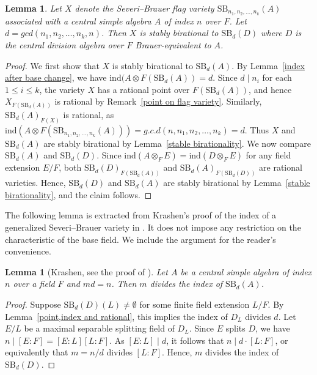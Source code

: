 \documentclass[10pt]{amsart}
\theoremstyle{plain}
\newtheorem{lemma}[thm]{Lemma}
\theoremstyle{definition}
\begin{document}
\begin{lemma}\label{Severi--Brauer flag to generalized Severi--Brauer}
     Let \(X\) denote the Severi--Brauer flag variety \(\mathrm{SB}_{n_1,n_2,\dots,n_k}(A)\) associated with a central simple algebra \(A\) of index \(n\) over \(F\). Let \( d=gcd(n_1,n_2,\dots,n_k,n)\). Then \(X\) is stably birational to \(\mathrm{SB}_d(D)\) where \(D\) is the central division algebra over \(F\) Brauer-equivalent to \(A\).
\end{lemma}
\begin{proof}
We first show that \(X\) is stably birational to \(\mathrm{SB}_d(A)\). By Lemma~\ref{index after base change}, we have \(\mathrm{ind}(A\otimes F(\mathrm{SB}_d(A))=d\). Since \(d \mid n_i\) for each \(1 \le i \le k\), the variety \(X\) has a rational point over \(F(\mathrm{SB}_d(A))\), and hence \(X_{F(\mathrm{SB}_d(A))}\) is rational by Remark~\ref{point on flag variety}. Similarly, \(\mathrm{SB}_d(A)_{F(X)}\) is rational, as \(\mathrm{ind}(A \otimes F(\mathrm{SB}_{n_1,n_2,\dots,n_k}(A)))= g.c.d (n,n_1,n_2,\dots,n_k)=d\). Thus \(X\) and \(\mathrm{SB}_d(A)\) are stably birational by Lemma~\ref{stable birationality}. We now compare \(\mathrm{SB}_d(A)\) and \(\mathrm{SB}_d(D)\). Since \(\mathrm{ind}(A \otimes_F E)=\mathrm{ind}(D \otimes_F E)\) for any field extension \(E/F\), both \(\mathrm{SB}_d(D)_{F(\mathrm{SB}_d(A))}\) and \(\mathrm{SB}_d(A)_{F(\mathrm{SB}_d(D))}\) are rational varieties. Hence, \(\mathrm{SB}_d(D)\) and \(\mathrm{SB}_d(A)\) are stably birational by Lemma~\ref{stable birationality}, and the claim follows.
\end{proof}
The following lemma is extracted from Krashen's proof of the index of a generalized Severi--Brauer variety in \cite{zerocycle}. It does not impose any restriction on the characteristic of the base field. We include the argument for the reader's convenience.

\begin{lemma}[Krashen, see the proof of {\cite[Lemma~7.1]{zerocycle}}]\label{m divides index}
    Let \(A\) be a central simple algebra of index \(n\) over a field \(F\) and \(md =n\). Then \(m\) divides the index of \(\mathrm{SB}_d(A)\).
\end{lemma}
\begin{proof}
    Suppose \(\mathrm{SB}_d(D)(L) \neq \emptyset\) for some finite field extension \(L/F\). By Lemma~\ref{point,index and rational}, this implies the index of \(D_L\) divides \(d\). Let \(E/L\) be a maximal separable splitting field of \(D_L\). Since \(E\) splits \(D\), we have
\(n \mid [E:F]=[E:L][L:F]\). As \([E:L]\mid d\), it follows that \(n \mid d \cdot [L:F]\),
or equivalently that \(m=n/d\) divides \([L:F]\). Hence, \(m\) divides the index of \(\mathrm{SB}_d(D)\).
\end{proof}
\end{document}
